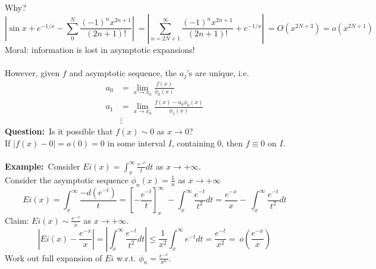 \documentclass{article}
\newcommand{\example}{\textbf{Example:}}
\newcommand{\question}{\textbf{Question:}}
\begin{document}
Why?
\[ \left| \sin x + e^{-1/x} - \sum_0^N \frac{ (-1)^n x^{2n+1}}{(2n+1)!} \right| \
= \left| \sum_{n = 2N+1}^{\infty} \frac{(-1)^n x^{2n+1}}{(2n+1)!} + e^{-1/x} \right| \
=O(x^{2N+3}) = o(x^{2N+1}) \]
Moral: information is lost in asymptotic expansions!
\\
\\
However, given $f$ and asymptotic sequence, the $a_j$'s are unique, i.e.
\begin{align*}
a_0 &= \lim_{x \to x_0} \frac{f(x)}{\phi_0(x)} \\
a_1 &= \lim_{x \to x_0} \frac{f(x)-a_0 \phi_0(x)}{\phi_1(x)} \\
& \vdots
\end{align*}
\question\ Is it possible that $f(x) \sim 0$ as $x \to 0$?
\\
If $|f(x) - 0| = o(0)=0$ in some interval $I$, containing $0$, then
$f \equiv 0$ on $I$.
\\
\\
\example\ Consider $Ei(x) = \int_{x}^{\infty} \frac{e^{-t}}{t} dt$ as 
$x \to + \infty$.
\\
Consider the asymptotic sequence $\phi_n(x) = \frac{1}{n}$ as $x \to + \infty$
\[ Ei(x) = \int_{x}^{\infty} \frac{-d(e^{-t})}{t} = \left[ -\frac{e^{-t}}{t} \right]_{x}^{\infty} \
- \int_x^{\infty} \frac{e^{-t}}{t^2} dt = \frac{e^{-x}}{x} - \
\int_x^{\infty} \frac{e^{-t}}{t^2} dt\]
Claim: $Ei(x) \sim \frac{e^{-x}}{x}$ as $x \to + \infty$.
\[ \left| Ei(x) - \frac{e^{-x}}{x} \right| = \left| \int_x^{\infty} \frac{e^{-t}}{t^2} dt \right|
\leq \frac{1}{x^2} \int_x^{\infty} e^{-t} dt = \frac{e^{-t}}{x^2} = \
o\left(\frac{e^{-x}}{x} \right) \]
Work out full expansion of $Ei$ w.r.t. $\phi_n = \frac{e^{-x}}{x^n}$.
\end{document}
